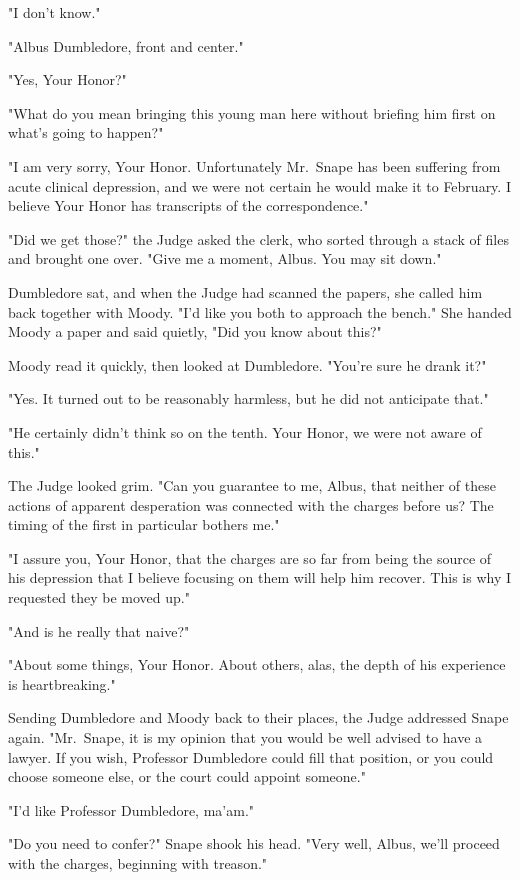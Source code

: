 "I don't know."

"Albus Dumbledore, front and center."

"Yes, Your Honor?"

"What do you mean bringing this young man here without briefing him first on what's going to happen?"

"I am very sorry, Your Honor. Unfortunately Mr.~Snape has been suffering from acute clinical depression, and we were not certain he would make it to February. I believe Your Honor has transcripts of the correspondence."

"Did we get those?" the Judge asked the clerk, who sorted through a stack of files and brought one over. "Give me a moment, Albus. You may sit down."

Dumbledore sat, and when the Judge had scanned the papers, she called him back together with Moody. "I'd like you both to approach the bench." She handed Moody a paper and said quietly, "Did you know about this?"

Moody read it quickly, then looked at Dumbledore. "You're sure he drank it?"

"Yes. It turned out to be reasonably harmless, but he did not anticipate that."

"He certainly didn't think so on the tenth. Your Honor, we were not aware of this."

The Judge looked grim. "Can you guarantee to me, Albus, that neither of these actions of apparent desperation was connected with the charges before us? The timing of the first in particular bothers me."

"I assure you, Your Honor, that the charges are so far from being the source of his depression that I believe focusing on them will help him recover. This is why I requested they be moved up."

"And is he really that naive?"

"About some things, Your Honor. About others, alas, the depth of his experience is heartbreaking."

Sending Dumbledore and Moody back to their places, the Judge addressed Snape again. "Mr.~Snape, it is my opinion that you would be well advised to have a lawyer. If you wish, Professor Dumbledore could fill that position, or you could choose someone else, or the court could appoint someone."

"I'd like Professor Dumbledore, ma'am."

"Do you need to confer?" Snape shook his head. "Very well, Albus, we'll proceed with the charges, beginning with treason."

